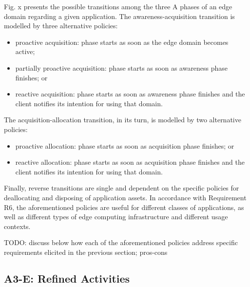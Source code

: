 Fig. x presents the possible transitions among the three A phases of an edge domain regarding a given application. The awareness-acquisition transition is modelled by three alternative policies: 

\begin{itemize}

\item proactive acquisition: phase starts as soon as the edge domain becomes active; 

\item partially proactive acquisition: phase starts as soon as awareness phase finishes; or

\item reactive acquisition: phase starts as soon as awareness phase finishes and the client notifies its intention for using that domain.

\end{itemize}

The acquisition-allocation transition, in its turn, is modelled by two alternative policies: 

\begin{itemize}

\item proactive allocation: phase starts as soon as acquisition phase finishes; or

\item reactive allocation: phase starts as soon as acquisition phase finishes and the client notifies its intention for using that domain.

\end{itemize}

Finally, reverse transitions are single and dependent on the specific policies for deallocating and disposing of application assets. 
In accordance with Requirement R6, the aforementioned policies are useful for different classes of applications, as well as different types of edge computing infrastructure and different usage contexts.


TODO: discuss below how each of the aforementioned policies address specific requirements elicited in the previous section; pros-cons

\subsection{A3-E: Refined Activities}

